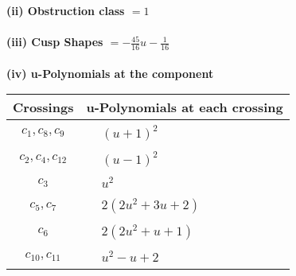 \documentclass[1p]{elsarticle_modified}
\theoremstyle{definition}
\begin{document}
\flushleft \textbf{(ii) Obstruction class $= 1$}\\~\\
\flushleft \textbf{(iii) Cusp Shapes $= -\frac{45}{16} u-\frac{1}{16}$}\\~\\
\newpage\renewcommand{\arraystretch}{1}
\flushleft \textbf{(iv) u-Polynomials at the component}\newline \\
\begin{tabular}{m{50pt}|m{274pt}}
Crossings & \hspace{64pt}u-Polynomials at each crossing \\
\hline $$\begin{aligned}c_{1},c_{8},c_{9}\end{aligned}$$&$\begin{aligned}
&(u+1)^2
\end{aligned}$\\
\hline $$\begin{aligned}c_{2},c_{4},c_{12}\end{aligned}$$&$\begin{aligned}
&(u-1)^2
\end{aligned}$\\
\hline $$\begin{aligned}c_{3}\end{aligned}$$&$\begin{aligned}
&u^2
\end{aligned}$\\
\hline $$\begin{aligned}c_{5},c_{7}\end{aligned}$$&$\begin{aligned}
&2(2 u^2+3 u+2)
\end{aligned}$\\
\hline $$\begin{aligned}c_{6}\end{aligned}$$&$\begin{aligned}
&2(2 u^2+u+1)
\end{aligned}$\\
\hline $$\begin{aligned}c_{10},c_{11}\end{aligned}$$&$\begin{aligned}
&u^2- u+2
\end{aligned}$\\
\hline
\end{tabular}\\~\\
\end{document}
